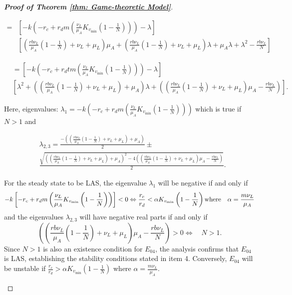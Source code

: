 \documentclass{article}
\theoremstyle{remark}
\theoremstyle{custom} %
\begin{document}
\begin{proof}[\textbf{Proof of Theorem \ref{thm: Game-theoretic Model}}]
\begin{itemize}
$$
\begin{aligned}
= & {\left[-k\left(-r_c+r_d m\left(\frac{\nu_L}{\mu_A} K_{v_{\min }}\left(1-\frac{1}{{N}}\right)\right)\right)-\lambda\right] } \\
& {\left[\left(\frac{r b \nu_L}{\mu_A}\left(1-\frac{1}{{N}}\right)+\nu_L+\mu_L\right) \mu_A+\left(\frac{r b \nu_L}{\mu_A}\left(1-\frac{1}{{N}}\right)+\nu_L+\mu_L\right) \lambda+\mu_A \lambda+\lambda^2-\frac{r b \nu_L}{{N}}\right] }
\end{aligned}
$$

$$
\begin{aligned}
& =\left[-k\left(-r_c+r_d t m\left(\frac{\nu_L}{\mu_A} K_{v_{\min }}\left(1-\frac{1}{{N}}\right)\right)\right)-\lambda\right] \\
& {\left[\lambda^2+\left(\left(\frac{r b \nu_L}{\mu_A}\left(1-\frac{1}{{N}}\right)+\nu_L+\mu_L\right)+\mu_A\right) \lambda+\left(\left(\frac{r b \nu_L}{\mu_A}\left(1-\frac{1}{{N}}\right)+\nu_L+\mu_L\right) \mu_A-\frac{r b \nu_L}{{N}}\right)\right]}.
\end{aligned}
$$

Here, eigenvalues: $
\lambda_1=-k\left(-r_c+r_d m\left(\frac{\nu_L}{\mu_A} K_{v_{\min }}\left(1-\frac{1}{{N}}\right)\right)\right) 
$ which is true if $N>1$ and 

$$
\begin{aligned}
& \lambda_{2,3}=\frac{-\left(\left(\frac{r b \nu_L}{\mu_A}\left(1-\frac{1}{{N}}\right)+\nu_L+\mu_L\right)+\mu_A\right)}{2} \pm \\
& \frac{\sqrt{\left(\left(\frac{r b \nu_L}{\mu_A}\left(1-\frac{1}{{N}}\right)+\nu_L+\mu_L\right)+\mu_A\right)^2-4\left(\left(\frac{r b \nu_L}{\mu_A}\left(1-\frac{1}{{N}}\right)+\nu_L+\mu_L\right) \mu_A-\frac{r b \nu_L}{{N}}\right)}}{2}.
\end{aligned}
$$ 



For the steady state to be LAS, the eigenvalue \(\lambda_1\) will be negative if and only if
 $$
 -k\left[-r_c+r_d m\left(\frac{\nu_L}{\mu_A} K_{v_{\min }}\left(1-\frac{1}{{N}}\right)\right)\right]<0 \\
 \Leftrightarrow \frac{r_c}{r_d}<\alpha K_{v_{\min }}\left(1-\frac{1}{{N}}\right) \text {where} \quad \alpha=\frac{m\nu_L}{\mu_A}
$$
and the eigenvalues \(\lambda_{2, 3}\) will have negative real parts if and only if
$$
\left(\left(\frac{r b \nu_L}{\mu_A}\left(1-\frac{1}{{N}}\right)+\nu_L+\mu_L\right) \mu_A-\frac{r b \nu_L}{{N}}\right)>0 
\Leftrightarrow \quad {N}>1.
$$ 
 Since $N>1$ is also an existence condition for $E_{04}$, the analysis confirms that $E_{04}$ is LAS, establishing the stability conditions stated in item 4.
Conversely, $E_{04}$ will be unstable if $\frac{r_c}{r_d}>\alpha K_{v_{\min }}\left(1-\frac{1}{N}\right)$ where $\alpha=\frac{m \nu_L}{\mu_A}$.
\end{itemize}
\end{proof}
\end{document}
